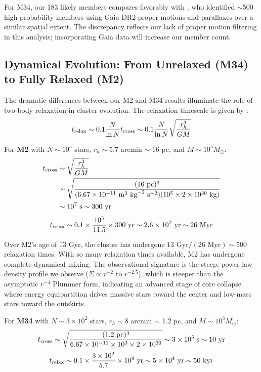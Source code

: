 \documentclass[linenumbers,trackchanges,twocolumn]{aastex701}
\begin{document}
For M34, our 183 likely members compares favorably with \citet{2018A&A...618A..93C}, who identified $\sim$500 high-probability members using Gaia DR2 proper motions and parallaxes over a similar spatial extent. The discrepancy reflects our lack of proper motion filtering in this analysis; incorporating Gaia data will increase our member count.

\subsection{Dynamical Evolution: From Unrelaxed (M34) to Fully Relaxed (M2)}

The dramatic differences between our M2 and M34 results illuminate the role of two-body relaxation in cluster evolution. The relaxation timescale is given by \citep{binney2008}:
\begin{equation}
t_{\rm relax} \sim 0.1 \frac{N}{\ln N} t_{\rm cross} \sim 0.1 \frac{N}{\ln N} \sqrt{\frac{r_h^3}{GM}}
\label{eq:relax_time}
\end{equation}

For \textbf{M2} with $N \sim 10^5$ stars, $r_h \sim 5.7$ arcmin $\sim$ 16 pc, and $M \sim 10^5 M_\odot$:
\begin{align}
t_{\rm cross} &\sim \sqrt{\frac{r_h^3}{GM}} \\
&\sim \sqrt{\frac{(16 \text{ pc})^3}{(6.67 \times 10^{-11} \text{ m}^3 \text{ kg}^{-1} \text{ s}^{-2})(10^5 \times 2 \times 10^{30} \text{ kg})}} \\
&\sim 10^7 \text{ s} \sim 300 \text{ yr}
\end{align}
\begin{equation}
t_{\rm relax} \sim 0.1 \times \frac{10^5}{11.5} \times 300 \text{ yr} \sim 2.6 \times 10^7 \text{ yr} \sim 26 \text{ Myr}
\end{equation}

Over M2's age of 13 Gyr, the cluster has undergone $13 \text{ Gyr} / (26 \text{ Myr}) \sim 500$ relaxation times. With so many relaxation times available, M2 has undergone complete dynamical mixing. The observational signature is the steep, power-law density profile we observe ($\Sigma \propto r^{-2}$ to $r^{-2.5}$), which is steeper than the asymptotic $r^{-4}$ Plummer form, indicating an advanced stage of core collapse where energy equipartition drives massive stars toward the center and low-mass stars toward the outskirts.

For \textbf{M34} with $N \sim 3 \times 10^2$ stars, $r_h \sim 8$ arcmin $\sim$ 1.2 pc, and $M \sim 10^3 M_\odot$:
\begin{equation}
t_{\rm cross} \sim \sqrt{\frac{(1.2 \text{ pc})^3}{6.67 \times 10^{-11} \times 10^3 \times 2 \times 10^{30}}} \sim 3 \times 10^5 \text{ s} \sim 10 \text{ yr}
\end{equation}
\begin{equation}
t_{\rm relax} \sim 0.1 \times \frac{3 \times 10^2}{5.7} \times 10^4 \text{ yr} \sim 5 \times 10^4 \text{ yr} \sim 50 \text{ kyr}
\end{equation}
\end{document}
